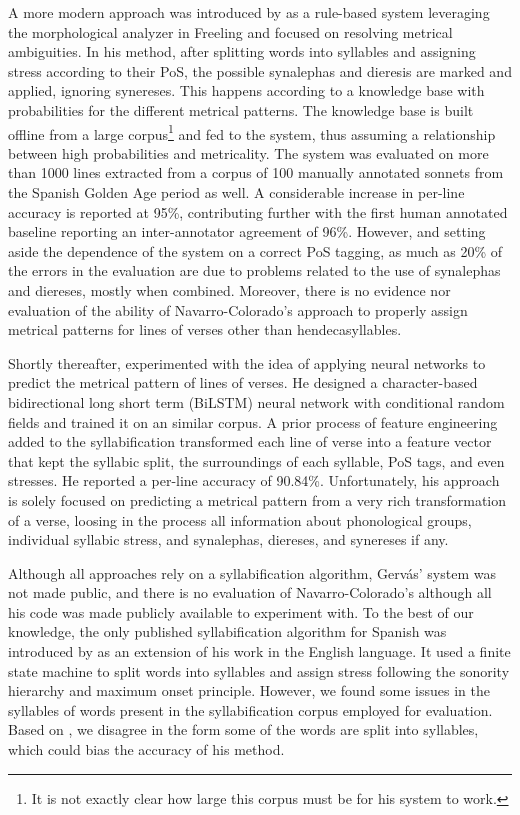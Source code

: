 \documentclass[a4paper,11pt,twocolumn,twoside]{article}
\begin{document}
A more modern approach was introduced by  as a rule-based system leveraging the morphological analyzer in Freeling \cite{padro2012freeling} and focused on resolving metrical ambiguities. In his method, after splitting words into syllables and assigning stress according to their PoS, the possible synalephas and dieresis are marked and applied, ignoring synereses. This happens according to a knowledge base with probabilities for the different metrical patterns. The knowledge base is built offline from a large corpus\footnote{It is not exactly clear how large this corpus must be for his system to work.} and fed to the system, thus assuming a relationship between high probabilities and metricality. The system was evaluated on more than 1000 lines extracted from a corpus of 100 manually annotated sonnets from the Spanish Golden Age period as well. A considerable increase in per-line accuracy is reported at 95\%, contributing further with the first human annotated baseline reporting an inter-annotator agreement of 96\%. However, and setting aside the dependence of the system on a correct PoS tagging, as much as 20\% of the errors in the evaluation are due to problems related to the use of synalephas and diereses, mostly when combined. Moreover, there is no evidence nor evaluation of the ability of Navarro-Colorado's approach to properly assign metrical patterns for lines of verses other than hendecasyllables.

Shortly thereafter,  experimented with the idea of applying neural networks to predict the metrical pattern of lines of verses. He designed a character-based bidirectional long short term (BiLSTM) neural network with conditional random fields and trained it on an similar corpus. A prior process of feature engineering added to the syllabification transformed each line of verse into a feature vector that kept the syllabic split, the surroundings of each syllable, PoS tags, and even stresses. He reported a per-line accuracy of 90.84\%. Unfortunately, his approach is solely focused on predicting a metrical pattern from a very rich transformation of a verse, loosing in the process all information about phonological groups, individual syllabic stress, and synalephas, diereses, and synereses if any.

Although all approaches rely on a syllabification algorithm, Gervás' system was not made public, and there is no evaluation of Navarro-Colorado's although all his code was made publicly available to experiment with. To the best of our knowledge, the only published syllabification algorithm for Spanish was introduced by  as an extension of his work in the English language. It used a finite state machine to split words into syllables and assign stress following the sonority hierarchy and maximum onset principle. However, we found some issues in the syllables of words present in the syllabification corpus employed for evaluation. Based on , we disagree in the form some of the words are split into syllables, which could bias the accuracy of his method.
\end{document}
